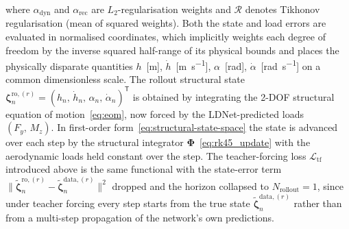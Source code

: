 where $\alpha_\mathrm{dyn}$ and $\alpha_\mathrm{rec}$ are $L_2$-regularisation weights
and $\mathcal{R}$ denotes Tikhonov regularisation (mean of squared weights). Both the
state and load errors are evaluated in normalised coordinates, which implicitly weights each
degree of freedom by the inverse squared half-range of its physical bounds and places the
physically disparate quantities
$h$~[\si{\meter}], $\dot{h}$~[\si{\meter\per\second}], $\alpha$~[\si{\radian}], $\dot{\alpha}$~[\si{\radian\per\second}]
on a common dimensionless scale. The rollout structural state
$\boldsymbol{\zeta}_n^{\mathrm{ro},(r)} = (h_n,\,\dot{h}_n,\,\alpha_n,\,\dot{\alpha}_n)^\mathsf{T}$
is obtained by integrating the 2-DOF structural equation of
motion~\eqref{eq:eom}, now forced by the
LDNet-predicted loads $(F_y,\,M_z)$. In first-order form~\eqref{eq:structural-state-space}
the state is advanced over each step by the structural integrator
$\boldsymbol{\Phi}$~\eqref{eq:rk45_update}
with the aerodynamic loads held constant over the step. The teacher-forcing loss
$\mathcal{L}_\mathrm{tf}$ introduced above is the same functional with the state-error term
$\|\tilde{\boldsymbol{\zeta}}_n^{\mathrm{ro},(r)} - \tilde{\boldsymbol{\zeta}}_n^{\mathrm{data},(r)}\|^2$
dropped and the horizon collapsed to $N_\mathrm{rollout} = 1$, since under teacher forcing every
step starts from the true state $\tilde{\boldsymbol{\zeta}}_n^{\mathrm{data},(r)}$ rather than
from a multi-step propagation of the network's own predictions.

